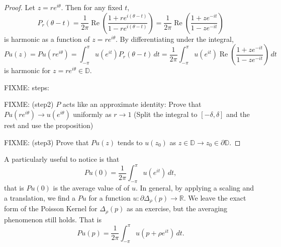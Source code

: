 \documentclass[12pt,openany]{book}
\renewcommand{\Re}{\operatorname{Re}}
\newcommand{\R}{{\mathbb{R}}}
\newcommand{\D}{{\mathbb{D}}}
\theoremstyle{plain}
\theoremstyle{remark}
\theoremstyle{definition}
\theoremstyle{exercise}
\theoremstyle{example}
\begin{document}
\begin{proof}
Let $z = re^{i\theta}$.
Then for any fixed $t$,
\begin{equation*}
P_r(\theta-t)
=
\frac{1}{2\pi}
\Re
\left(
\frac{1+re^{i(\theta-t)}}{1-re^{i(\theta-t)}}
\right) 
=
\frac{1}{2\pi}
\Re
\left(
\frac{1+ze^{-it}}{1-ze^{-it}}
\right)
\end{equation*}
is harmonic as a function of $z=re^{i\theta}$.
By differentiating under the integral,
\begin{equation*}
Pu(z)
=
Pu(re^{i\theta})
=
\int_{-\pi}^\pi u(e^{it}) P_r(\theta-t) \, dt
=
\frac{1}{2\pi}
\int_{-\pi}^\pi u(e^{it}) 
\Re
\left(
\frac{1+z e^{-it}}{1-z e^{-it}}
\right) 
\, dt
\end{equation*}
is harmonic for $z = re^{i\theta} \in \D$.

FIXME: steps:

FIXME: (step2)
$P$ acts like an
approximate identity: Prove that
$Pu(re^{i\theta}) \to u(e^{i\theta})$ uniformly as
$r \to 1$ (Split the integral to $[-\delta,\delta]$ and the rest
and use the proposition)

FIXME: (step3)
Prove that $Pu(z)$ tends to $u(z_0)$ as
$z \in \D \to z_0 \in \partial \D$.
\end{proof}

A particularly useful to notice is that
\begin{equation*}
Pu(0) = \frac{1}{2\pi} \int_{-\pi}^{\pi}u(e^{it}) \, dt ,
\end{equation*}
that is $Pu(0)$ is the average value of of $u$.  In general, by applying
a scaling and a translation, we find a $Pu$ for a function $u \colon
\partial \Delta_\rho(p) \to \R$.  We
leave the exact form of the Poisson Kernel for $\Delta_\rho(p)$ as an
exercise, but the averaging phenomenon still holds.  That is
\begin{equation} \label{eq:averageofPu}
Pu(p) = \frac{1}{2\pi} \int_{-\pi}^{\pi}u(p + \rho e^{it}) \, dt .
\end{equation}
\end{document}
